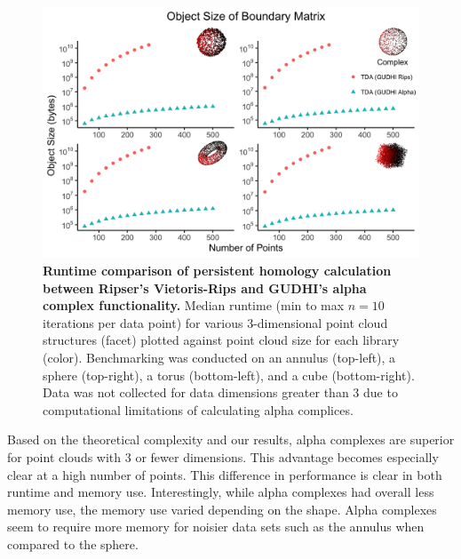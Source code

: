 \begin{figure}
  \centering
  \includegraphics[width=6in]{fig9.png}
  \caption{
    \textbf{Runtime comparison of persistent homology calculation between Ripser's Vietoris-Rips and GUDHI's alpha complex functionality.}
    Median runtime (min to max $n=10$ iterations per data point) for various 3-dimensional point cloud structures (facet) plotted against point cloud size for each library (color).
    Benchmarking was conducted on an annulus (top-left), a sphere (top-right), a torus (bottom-left), and a cube (bottom-right).
    Data was not collected for data dimensions greater than 3 due to computational limitations of calculating alpha complices.}
\label{fig:fin}
\end{figure}

Based on the theoretical complexity and our results, alpha complexes are
superior for point clouds with 3 or fewer dimensions. This advantage
becomes especially clear at a high number of points. This difference in
performance is clear in both runtime and memory use. Interestingly,
while alpha complexes had overall less memory use, the memory use varied
depending on the shape. Alpha complexes seem to require more memory for
noisier data sets such as the annulus when compared to the sphere.

